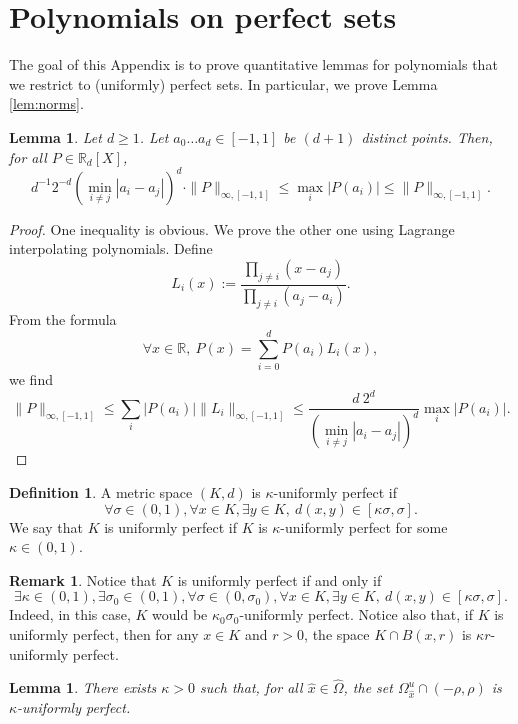 \documentclass[a4paper]{article}
\newtheorem{lemma}[theorem]{Lemma}
\theoremstyle{definition}
\newtheorem{definition}{Definition}[section]
\newtheorem{remark}[example]{Remark}
\begin{document}
\section{Polynomials on perfect sets}\label{ap:B}

The goal of this Appendix is to prove quantitative  lemmas for polynomials that we restrict to (uniformly) perfect sets. In particular, we prove Lemma \ref{lem:norms}.

\begin{lemma}\label{lem:lagrange}
Let $d \geq 1$. Let $a_0 \dots a_d \in [-1,1]$ be $(d+1)$ distinct points. Then, for all $P \in \mathbb{R}_d[X]$,
$$   d^{-1} 2^{-d} (\min_{i \neq j} |a_i-a_j|)^d \cdot \|P\|_{\infty,[-1,1]} \leq \max_i |P(a_i)| \leq \|P\|_{\infty,[-1,1]} . $$
\end{lemma}

\begin{proof}
One inequality is obvious. We prove the other one using Lagrange interpolating polynomials. Define
$$ L_i(x) := \frac{\prod_{j \neq i}(x-a_j)}{\prod_{j \neq i}(a_j-a_i)}. $$
From the formula $$\forall x \in \mathbb{R}, \ P(x) = \sum_{i=0}^d P(a_i) L_i(x),$$
we find
$$ \|P\|_{\infty,[-1,1]} \leq \sum_i |P(a_i)| \|L_i\|_{\infty,[-1,1]} \leq \frac{d \ 2^d}{(\min_{i \neq j} |a_i - a_j|)^d} \max_i |P(a_i)|.$$
\end{proof}

\begin{definition}
A metric space $(K,d)$ is $\kappa$-uniformly perfect if
$$ \forall \sigma \in (0,1),  \forall x \in K,  \exists y \in K, \ d(x,y) \in [\kappa \sigma, \sigma] .$$
We say that $K$ is uniformly perfect if $K$ is $\kappa$-uniformly perfect for some $\kappa \in (0,1)$.
\end{definition}

\begin{remark}
Notice that $K$ is uniformly perfect if and only if
$$\exists \kappa\in (0,1), \exists \sigma_0 \in (0,1), \forall \sigma \in (0,\sigma_0),  \forall x \in K,  \exists y \in K, \ d(x,y) \in [\kappa \sigma, \sigma] .$$
Indeed, in this case, $K$ would be $\kappa_0 \sigma_0$-uniformly perfect. Notice also that, if $K$ is uniformly perfect, then for any $x \in K$ and $r>0$, the space $K \cap B(x,r)$ is $\kappa r$-uniformly perfect.
\end{remark}

\begin{lemma}\label{lem:uperfect}
There exists $\kappa>0$ such that, for all ${\widehat{x}} \in \widehat{\Omega}$, the set $\Omega_{\widehat{x}}^u \cap (-\rho,\rho)$ is $\kappa$-uniformly perfect. 
\end{lemma}
\end{document}
